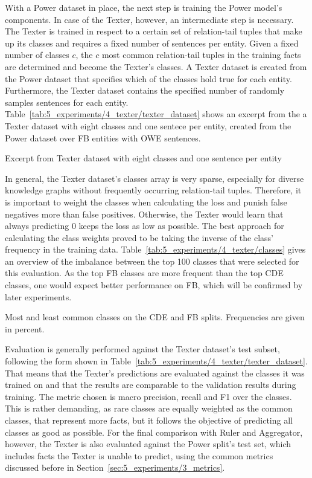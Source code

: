 With a Power dataset in place, the next step is training the Power model's components. In case of the Texter, however, an intermediate step is necessary. The Texter is trained in respect to a certain set of relation-tail tuples that make up its classes and requires a fixed number of sentences per entity. Given a fixed number of classes $c$, the $c$ most common relation-tail tuples in the training facts are determined and become the Texter's classes. A Texter dataset is created from the Power dataset that specifies which of the classes hold true for each entity. Furthermore, the Texter dataset contains the specified number of randomly samples sentences for each entity. Table~\ref{tab:5_experiments/4_texter/texter_dataset} shows an excerpt from the a Texter dataset with eight classes and one sentece per entity, created from the Power dataset over FB entities with OWE sentences.

\begin{table}[h]
    \centering
    
    \caption{Excerpt from Texter dataset with eight classes and one sentence per entity}
    \label{tab:5_experiments/4_texter/texter_dataset}
\end{table}

In general, the Texter dataset's classes array is very sparse, especially for diverse knowledge graphs without frequently occurring relation-tail tuples. Therefore, it is important to weight the classes when calculating the loss and punish false negatives more than false positives. Otherwise, the Texter would learn that always predicting 0 keeps the loss as low as possible. The best approach for calculating the class weights proved to be taking the inverse of the class' frequency in the training data. Table~\ref{tab:5_experiments/4_texter/classes} gives an overview of the imbalance between the top 100 classes that were selected for this evaluation. As the top FB classes are more frequent than the top CDE classes, one would expect better performance on FB, which will be confirmed by later experiments.

\begin{table}[h]
    \centering
    
    \caption{Most and least common classes on the CDE and FB splits. Frequencies are given in percent.}
    \label{tab:5_experiments/4_texter/classes}
\end{table}

Evaluation is generally performed against the Texter dataset's test subset, following the form shown in Table~\ref{tab:5_experiments/4_texter/texter_dataset}. That means that the Texter's predictions are evaluated against the classes it was trained on and that the results are comparable to the validation results during training. The metric chosen is macro precision, recall and F1 over the classes. This is rather demanding, as rare classes are equally weighted as the common classes, that represent more facts, but it follows the objective of predicting all classes as good as possible. For the final comparison with Ruler and Aggregator, however, the Texter is also evaluated against the Power split's test set, which includes facts the Texter is unable to predict, using the common metrics discussed before in Section~\ref{sec:5_experiments/3_metrics}.

